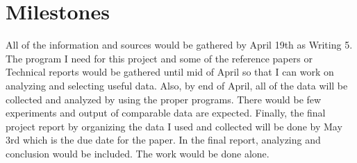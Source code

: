 \documentclass[12pt]{article}
\begin{document}
\section{Milestones}
All of the information and sources would be gathered by April 19th as Writing 5. The program I need for this project and some of the reference papers or Technical reports would be gathered until mid of April so that I can work on analyzing and selecting useful data. Also, by end of April, all of the data will be collected and analyzed by using the proper programs. There would be few experiments and output of comparable data are expected. Finally, the final project report by organizing the data I used and collected will be done by May 3rd which is the due date for the paper. In the final report, analyzing and conclusion would be included. The work would be done alone.  



\end{document}
